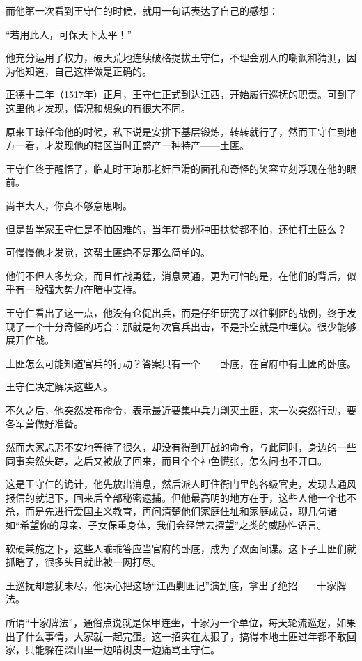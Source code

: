 \begin{multicols}{\theparacolNo}
		而他第一次看到王守仁的时候，就用一句话表达了自己的感想：

		“若用此人，可保天下太平！”

		他充分运用了权力，破天荒地连续破格提拔王守仁，不理会别人的嘲讽和猜测，因为他知道，自己这样做是正确的。

		正德十二年（1517年）正月，王守仁正式到达江西，开始履行巡抚的职责。可到了这里他才发现，情况和想象的有很大不同。

		原来王琼任命他的时候，私下说是安排下基层锻炼，转转就行了，然而王守仁到地方一看，才发现他的辖区当时正盛产一种特产——土匪。

		王守仁终于醒悟了，临走时王琼那老奸巨滑的面孔和奇怪的笑容立刻浮现在他的眼前。

		尚书大人，你真不够意思啊。

		但是哲学家王守仁是不怕困难的，当年在贵州种田扶贫都不怕，还怕打土匪么？

		可慢慢他才发觉，这帮土匪绝不是那么简单的。

		他们不但人多势众，而且作战勇猛，消息灵通，更为可怕的是，在他们的背后，似乎有一股强大势力在暗中支持。

		王守仁看出了这一点，他没有仓促出兵，而是仔细研究了以往剿匪的战例，终于发现了一个十分奇怪的巧合：那就是每次官兵出击，不是扑空就是中埋伏。很少能够展开作战。

		土匪怎么可能知道官兵的行动？答案只有一个——卧底，在官府中有土匪的卧底。

		王守仁决定解决这些人。

		不久之后，他突然发布命令，表示最近要集中兵力剿灭土匪，来一次突然行动，要各军营做好准备。

		然而大家忐忑不安地等待了很久，却没有得到开战的命令，与此同时，身边的一些同事突然失踪，之后又被放了回来，而且个个神色慌张，怎么问也不开口。

		这是王守仁的诡计，他先放出消息，然后派人盯住衙门里的各级官吏，发现去通风报信的就记下，回来后全部秘密逮捕。但他最高明的地方在于，这些人他一个也不杀，而是先进行爱国主义教育，再问清楚他们家庭住址和家庭成员，聊几句诸如“希望你的母亲、子女保重身体，我们会经常去探望”之类的威胁性语言。

		软硬兼施之下，这些人乖乖答应当官府的卧底，成为了双面间谍。这下子土匪们就抓瞎了，很多头目就此被一网打尽。

		王巡抚却意犹未尽，他决心把这场“江西剿匪记”演到底，拿出了绝招——十家牌法。

		所谓“十家牌法”，通俗点说就是保甲连坐，十家为一个单位，每天轮流巡逻，如果出了什么事情，大家就一起完蛋。这一招实在太狠了，搞得本地土匪过年都不敢回家，只能躲在深山里一边啃树皮一边痛骂王守仁。


\end{multicols}
